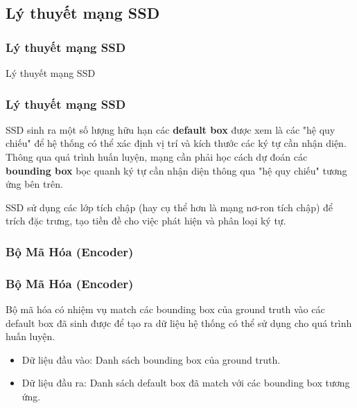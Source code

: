 \documentclass{beamer}
\begin{document}
	\subsection{Lý thuyết mạng SSD}
	
	\begin{frame}
		\frametitle{Lý thuyết mạng SSD}
		{\Huge Lý thuyết mạng SSD}
	\end{frame}
	
	\begin{frame}
		\frametitle{Lý thuyết mạng SSD}
		
		SSD sinh ra một số lượng hữu hạn các \textbf{default box} được xem là các "hệ quy chiếu" để hệ thống có thể xác định vị trí và kích thước các ký tự cần nhận diện. Thông qua quá trình huấn luyện, mạng cần phải học cách dự đoán các \textbf{bounding box} bọc quanh ký tự cần nhận diện thông qua "hệ quy chiếu" tương ứng bên trên.
		
		SSD sử dụng các lớp tích chập (hay cụ thể hơn là mạng nơ-ron tích chập) để trích đặc trưng, tạo tiền đề cho việc phát hiện và phân loại ký tự. \\
		
	\end{frame}
	
	
	
	\subsubsection{Bộ Mã Hóa (Encoder)}
	
	\begin{frame}
		\frametitle{Bộ Mã Hóa (Encoder)}
		
		Bộ mã hóa có nhiệm vụ match các bounding box của ground truth vào các default box đã sinh được để tạo ra dữ liệu hệ thống có thể sử dụng cho quá trình huấn luyện.\\
		
		\begin{itemize}
			\item Dữ liệu đầu vào: Danh sách bounding box của ground truth.
			\item Dữ liệu đầu ra: Danh sách default box đã match với các bounding box tương ứng.
		\end{itemize}
		
		
		
		
		
	\end{frame}
	
\end{document}
